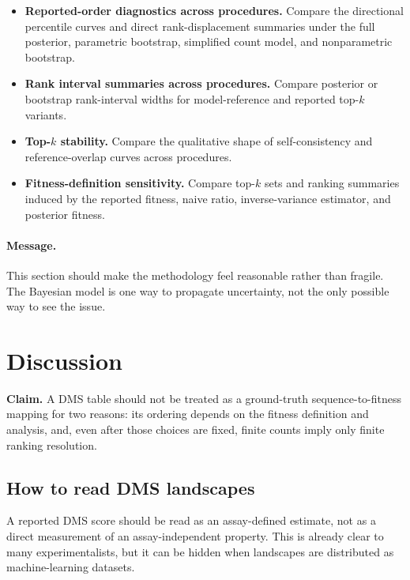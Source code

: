 \documentclass[11pt]{article}
\begin{document}
\begin{itemize}
  \item[\textbf{(a)}] \textbf{Reported-order diagnostics across procedures.} Compare the directional percentile curves and direct rank-displacement summaries under the full posterior, parametric bootstrap, simplified count model, and nonparametric bootstrap.
  \item[\textbf{(b)}] \textbf{Rank interval summaries across procedures.} Compare posterior or bootstrap rank-interval widths for model-reference and reported top-$k$ variants.
  \item[\textbf{(c)}] \textbf{Top-$k$ stability.} Compare the qualitative shape of self-consistency and reference-overlap curves across procedures.
  \item[\textbf{(d)}] \textbf{Fitness-definition sensitivity.} Compare top-$k$ sets and ranking summaries induced by the reported fitness, naive ratio, inverse-variance estimator, and posterior fitness.
\end{itemize}

\paragraph{Message.}
This section should make the methodology feel reasonable rather than fragile. The Bayesian model is one way to propagate uncertainty, not the only possible way to see the issue.

\section{Discussion}

\begin{callout}
\textbf{Claim.}
A DMS table should not be treated as a ground-truth sequence-to-fitness mapping for two reasons: its ordering depends on the fitness definition and analysis, and, even after those choices are fixed, finite counts imply only finite ranking resolution.
\end{callout}

\subsection*{How to read DMS landscapes}

A reported DMS score should be read as an assay-defined estimate, not as a direct measurement of an assay-independent property. This is already clear to many experimentalists, but it can be hidden when landscapes are distributed as machine-learning datasets.
\end{document}
